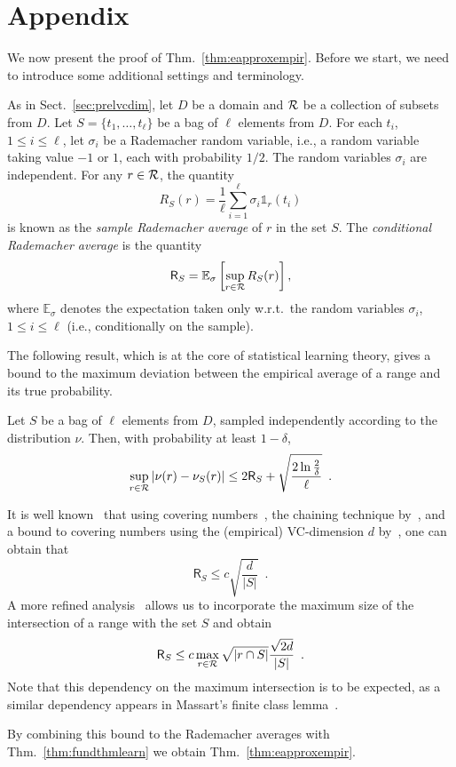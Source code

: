 \appendix
\section{Appendix}
We now present the proof of Thm.~\ref{thm:eapproxempir}. Before we start, we
need to introduce some additional settings and terminology.

As in Sect.~\ref{sec:prelvcdim}, let $D$ be a domain and $\mathcal{R}$ be a
collection of subsets from $D$. Let $S=\{t_1,\dotsc,t_\ell\}$ be a bag of $\ell$
elements from $D$. For each $t_i$, $1\le i\le \ell$, let $\sigma_i$ be a
Rademacher random variable, i.e., a random variable taking value $-1$ or $1$,
each with probability $1/2$. The random variables $\sigma_i$ are independent.
For any $r\in\mathcal{R}$, the quantity
\[
	R_S(r)=\frac{1}{\ell}\sum_{i=1}^\ell \sigma_i\mathds{1}_r(t_i)
\]
is known as the \emph{sample Rademacher average} of $r$ in the set $S$. The
\emph{conditional Rademacher average} is the quantity
\[
	\mathsf{R}_S=\mathbb{E}_\sigma\left[\sup_{r\in\mathcal{R}}R_S(r)\right],
\]
where $\mathbb{E}_\sigma$ denotes the expectation taken only w.r.t.~the random
variables $\sigma_i$, $1\le i\le\ell$ (i.e., conditionally on the sample).

The following result, which is at the core of statistical learning theory, gives
a bound to the maximum deviation between the empirical average of a range and
its true probability.

\begin{theorem}\label{thm:fundthmlearn}
	Let $S$ be a bag of $\ell$ elements from $D$, sampled independently
	according to the distribution $\nu$.  Then, with probability at least
	$1-\delta$,
	\[
		\sup_{r\in\mathcal{R}}|\nu(r)-\nu_S(r)|\le 2 \mathsf{R}_S
		+\sqrt{\frac{2\ln\frac{2}{\delta}}{\ell}}\enspace.
	\]
\end{theorem}

It is well known~\citep[Sect.~1.4.6]{Lugosi02} that using covering
numbers~\citep{AnthonyB99}, the chaining technique by~\citet{Dudley84}, and a
bound to covering numbers using the (empirical) VC-dimension $d$
by~\citet{Haussler95}, one can obtain that
\[
	\mathsf{R}_S\le c\sqrt{\frac{d}{|S|}}\enspace.
\]
A more refined analysis~\citep{SridharanTR} allows us to incorporate the maximum
size of the intersection of a range with the set $S$ and obtain
\[
	\mathsf{R}_S\le c\max_{r\in\mathcal{R}}\sqrt{|r\cap
	S|}\frac{\sqrt{2d}}{|S|}\enspace.
\]
Note that this dependency on the maximum intersection is to be expected, as a
similar dependency appears in Massart's finite class lemma~\citep[Lemma
26.8]{ShalevSBD14}.

By combining this bound to the Rademacher averages with
Thm.~\ref{thm:fundthmlearn} we obtain Thm.~\ref{thm:eapproxempir}.

